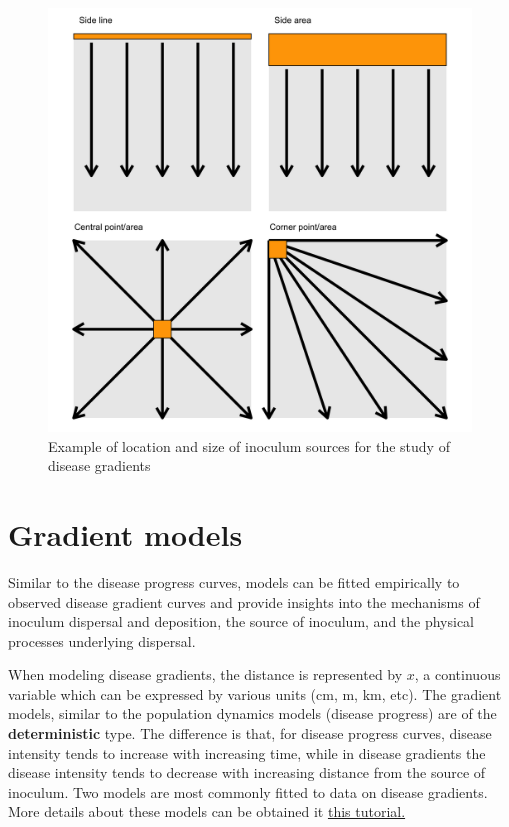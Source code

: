 \documentclass[
  letterpaper,
  DIV=11,
  numbers=noendperiod]{scrreprt}
\begin{document}
\begin{figure}

{\centering \includegraphics[width=6.08333in,height=\textheight]{imgs/gradients.png}

}

\caption{\label{fig-gradient}Example of location and size of inoculum
sources for the study of disease gradients}

\end{figure}

\hypertarget{gradient-models}{%
\chapter{Gradient models}\label{gradient-models}}

Similar to the disease progress curves, models can be fitted empirically
to observed disease gradient curves and provide insights into the
mechanisms of inoculum dispersal and deposition, the source of inoculum,
and the physical processes underlying dispersal.

When modeling disease gradients, the distance is represented by \(x\), a
continuous variable which can be expressed by various units (cm, m, km,
etc). The gradient models, similar to the population dynamics models
(disease progress) are of the \textbf{deterministic} type. The
difference is that, for disease progress curves, disease intensity tends
to increase with increasing time, while in disease gradients the disease
intensity tends to decrease with increasing distance from the source of
inoculum. Two models are most commonly fitted to data on disease
gradients. More details about these models can be obtained it
\href{https://www.apsnet.org/edcenter/disimpactmngmnt/topc/EcologyAndEpidemiologyInR/ModelingDispersalGradients/Pages/default.aspx}{this
tutorial.}
\end{document}
